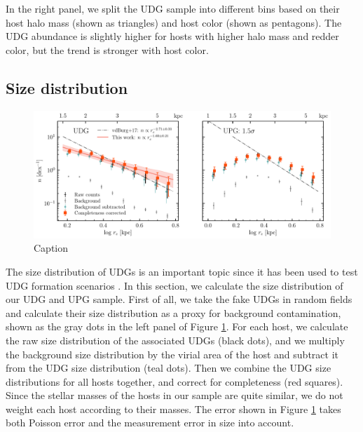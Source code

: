 \documentclass[twocolumn,astrosymb,twocolappendix]{aastex631}
\begin{document}
\begin{CJK*}{UTF8}{gbsn}
In the right panel, we split the UDG sample into different bins based on their host halo mass (shown as triangles) and host color (shown as pentagons). The UDG abundance is slightly higher for hosts with higher halo mass and redder color, but the trend is stronger with host color. 


\subsection{Size distribution}\label{sec:size_distr}
\begin{figure}
	\vbox{ 
		\centering
		\includegraphics[width=1\linewidth]{size_distribution.pdf}
	}
    \caption{Caption}
    \label{fig:size_distribution}
\end{figure}

The size distribution of UDGs is an important topic since it has been used to test UDG formation scenarios \citep[e.g.,][]{Amorisco2016,vdBurg2017}. In this section, we calculate the size distribution of our UDG and UPG sample. First of all, we take the fake UDGs in random fields and calculate their size distribution as a proxy for background contamination, shown as the gray dots in the left panel of Figure \ref{fig:size_distribution}. For each host, we calculate the raw size distribution of the associated UDGs (black dots), and we multiply the background size distribution by the virial area of the host and subtract it from the UDG size distribution (teal dots). Then we combine the UDG size distributions for all hosts together, and correct for completeness (red squares). Since the stellar masses of the hosts in our sample are quite similar, we do not weight each host according to their masses. The error shown in Figure \ref{fig:size_distribution} takes both Poisson error and the measurement error in size into account.


\end{CJK*}
\end{document}

